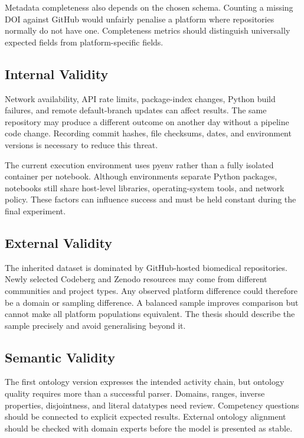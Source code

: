 Metadata completeness also depends on the chosen schema. Counting a missing DOI against GitHub would unfairly penalise a platform where repositories normally do not have one. Completeness metrics should distinguish universally expected fields from platform-specific fields.

\subsection{Internal Validity}

Network availability, API rate limits, package-index changes, Python build failures, and remote default-branch updates can affect results. The same repository may produce a different outcome on another day without a pipeline code change. Recording commit hashes, file checksums, dates, and environment versions is necessary to reduce this threat.

The current execution environment uses pyenv rather than a fully isolated container per notebook. Although environments separate Python packages, notebooks still share host-level libraries, operating-system tools, and network policy. These factors can influence success and must be held constant during the final experiment.

\subsection{External Validity}

The inherited dataset is dominated by GitHub-hosted biomedical repositories. Newly selected Codeberg and Zenodo resources may come from different communities and project types. Any observed platform difference could therefore be a domain or sampling difference. A balanced sample improves comparison but cannot make all platform populations equivalent. The thesis should describe the sample precisely and avoid generalising beyond it.

\subsection{Semantic Validity}

The first ontology version expresses the intended activity chain, but ontology quality requires more than a successful parser. Domains, ranges, inverse properties, disjointness, and literal datatypes need review. Competency questions should be connected to explicit expected results. External ontology alignment should be checked with domain experts before the model is presented as stable.

